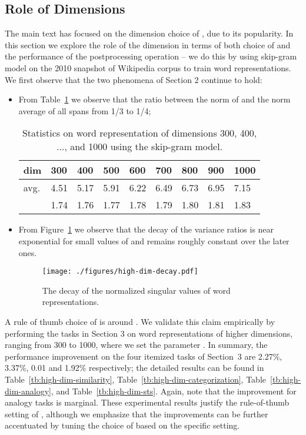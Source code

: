 \documentclass{article} \usepackage{acl2017,times}
\begin{document}
\subsection{Role of Dimensions}
The main text has focused on the dimension choice of , due to its popularity.  In this section we explore the role of the dimension in terms of both choice of  and  the performance of the postprocessing operation -- we do this by using skip-gram model on the 2010 snapshot of Wikipedia corpus \citep{al2013polyglot} to train word representations. We first observe that the two phenomena of Section 2  continue to hold: 
\begin{itemize}
\item From Table~\ref{tb:high-dim-stat} we  observe that the ratio between the norm of  and the norm average of all  spans from 1/3 to 1/4;
\begin{table}[!h]
\centering
\begin{tabular}{|l||l|l|l|l|l|l|l|l|}
\hline
 dim               & 300  & 400  & 500  & 600  & 700  & 800  & 900  & 1000 \\ \hline
 avg.  & 4.51 & 5.17 & 5.91 & 6.22 & 6.49 & 6.73 & 6.95 & 7.15 \\ \hline
           & 1.74 & 1.76 & 1.77 & 1.78 & 1.79 & 1.80 & 1.81 & 1.83 \\ \hline
\end{tabular}
\caption{Statistics on word representation of dimensions 300, 400, ..., and 1000 using the skip-gram model.}
\label{tb:high-dim-stat}
\end{table}
\item From Figure~\ref{fig:high-dim-decay} we  observe that the decay of the variance ratios  is near exponential for small values of  and remains roughly constant over the later ones. 
\begin{figure}[!h]
\centering
\texttt{[image: ./figures/high-dim-decay.pdf]}
\caption{The decay of the normalized singular values of word representations.}
\label{fig:high-dim-decay}
\end{figure}
\end{itemize}

A rule of thumb choice of  is around . We validate this claim empirically by performing the tasks in Section 3 on word representations of higher dimensions, ranging from 300 to 1000, where we set the parameter .  
In summary, the performance improvement on the four itemized tasks of Section~3 are 2.27\%, 3.37\%, 0.01 and 1.92\% respectively;  the detailed results can be found in  Table~\ref{tb:high-dim-similarity}, Table~\ref{tb:high-dim-categorization}, Table~\ref{tb:high-dim-analogy}, and Table~\ref{tb:high-dim-sts}. Again, note that the improvement for analogy tasks is marginal.  These experimental results justify the rule-of-thumb setting of , although we emphasize that the  improvements can be further accentuated by tuning the choice of  based on the specific setting. 
\end{document}
